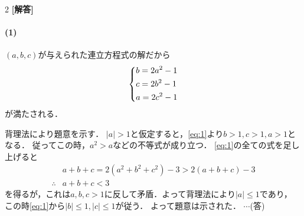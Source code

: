 \documentclass[../../main.tex]{subfiles}
\begin{document}
\setcounter{equation}{0}
\begin{oframed}
  
\end{oframed}
\setlength{\columnseprule}{0.4pt}
\begin{multicols}{2}
  {\bf [解答]}
  \paragraph{(1)}
  $(a,b,c)$が与えられた連立方程式の解だから
  \begin{align}
    \begin{dcases}
      b = 2a^2 - 1 \\
      c = 2b^2 - 1 \\
      a = 2c^2 - 1
    \end{dcases} \label{eq:1}
  \end{align}
  が満たされる．

  背理法により題意を示す．
  $|a|>1$と仮定すると，\cref{eq:1}より$b>1,c>1,a>1$となる．
  従ってこの時，$a^2>a$などの不等式が成り立つ．
  \cref{eq:1}の全ての式を足し上げると
  \begin{align}
    & a+b+c = 2(a^2+b^2+c^2)-3 > 2\left(a+b+c\right)-3 \\
    \therefore
    & a+b+c <3
  \end{align}
  を得るが，これは$a,b,c>1$に反して矛盾．よって背理法により$|a|\le 1$であり，
  この時\cref{eq:1}から$|b|\le 1, |c|\le 1$が従う．
  よって題意は示された．
  $\cdots$(答)


\end{multicols}
\end{document}
